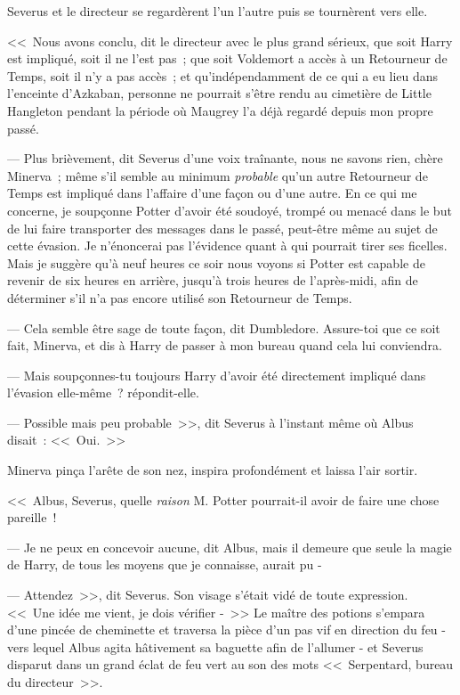Severus et le directeur se regardèrent l'un l'autre puis se tournèrent vers elle.

<<~Nous avons conclu, dit le directeur avec le plus grand sérieux, que soit Harry est impliqué, soit il ne l'est pas~; que soit Voldemort a accès à un Retourneur de Temps, soit il n'y a pas accès~; et qu'indépendamment de ce qui a eu lieu dans l'enceinte d'Azkaban, personne ne pourrait s'être rendu au cimetière de Little Hangleton pendant la période où Maugrey l'a déjà regardé depuis mon propre passé.

--- Plus brièvement, dit Severus d'une voix traînante, nous ne savons rien, chère Minerva~; même s'il semble au minimum \emph{probable} qu'un autre Retourneur de Temps est impliqué dans l'affaire d'une façon ou d'une autre. En ce qui me concerne, je soupçonne Potter d'avoir été soudoyé, trompé ou menacé dans le but de lui faire transporter des messages dans le passé, peut-être même au sujet de cette évasion. Je n'énoncerai pas l'évidence quant à qui pourrait tirer ses ficelles. Mais je suggère qu'à neuf heures ce soir nous voyons si Potter est capable de revenir de six heures en arrière, jusqu'à trois heures de l'après-midi, afin de déterminer s'il n'a pas encore utilisé son Retourneur de Temps.

--- Cela semble être sage de toute façon, dit Dumbledore. Assure-toi que ce soit fait, Minerva, et dis à Harry de passer à mon bureau quand cela lui conviendra.

--- Mais soupçonnes-tu toujours Harry d'avoir été directement impliqué dans l'évasion elle-même~? répondit-elle.

--- Possible mais peu probable~>>, dit Severus à l'instant même où Albus disait~: <<~Oui.~>>

Minerva pinça l'arête de son nez, inspira profondément et laissa l'air sortir.

<<~Albus, Severus, quelle \emph{raison} M. Potter pourrait-il avoir de faire une chose pareille~!

--- Je ne peux en concevoir aucune, dit Albus, mais il demeure que seule la magie de Harry, de tous les moyens que je connaisse, aurait pu -

--- Attendez~>>, dit Severus. Son visage s'était vidé de toute expression. <<~Une idée me vient, je dois vérifier -~>> Le maître des potions s'empara d'une pincée de cheminette et traversa la pièce d'un pas vif en direction du feu - vers lequel Albus agita hâtivement sa baguette afin de l'allumer - et Severus disparut dans un grand éclat de feu vert au son des mots <<~Serpentard, bureau du directeur~>>.

